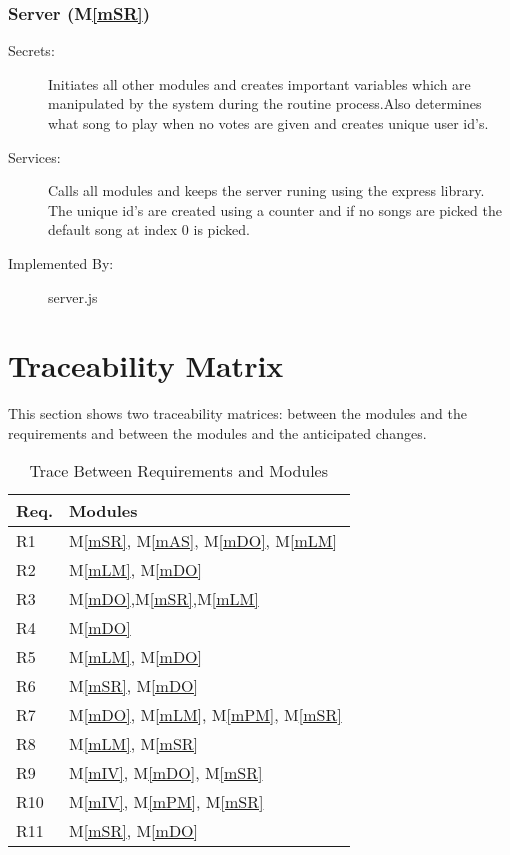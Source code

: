 \documentclass[12pt, titlepage]{article}
\newcommand{\mref}[1]{M\ref{#1}}
\begin{document}
\subsubsection{Server (\mref{mSR})}


\begin{description}
\item[Secrets:] Initiates all other modules and creates important variables which are manipulated by the system during the routine process.Also determines what song to play when no votes are given and creates unique user id's. 
\item[Services:]Calls all modules and keeps the server runing using the express library. The unique id's are created using a counter and if no songs are picked the default song at index 0 is picked.
\item[Implemented By:] server.js
\end{description}





\section{Traceability Matrix} \label{SecTM}


This section shows two traceability matrices: between the modules and the
requirements and between the modules and the anticipated changes.


\begin{table}[H]
\centering
\begin{tabular}{p{} p{}}
\toprule
\textbf{Req.} & \textbf{Modules}\\
\midrule
R1 & \mref{mSR}, \mref{mAS}, \mref{mDO}, \mref{mLM}\\
R2 & \mref{mLM}, \mref{mDO}\\
R3 & \mref{mDO},\mref{mSR},\mref{mLM}\\
R4 & \mref{mDO}\\
R5 & \mref{mLM}, \mref{mDO}\\
R6 & \mref{mSR}, \mref{mDO}\\
R7 & \mref{mDO}, \mref{mLM}, \mref{mPM}, \mref{mSR}\\
R8 & \mref{mLM}, \mref{mSR}\\
R9 & \mref{mIV}, \mref{mDO}, \mref{mSR}\\
R10 & \mref{mIV}, \mref{mPM}, \mref{mSR}\\
R11 & \mref{mSR}, \mref{mDO}\\
\bottomrule
\end{tabular}
\caption{Trace Between Requirements and Modules}
\label{TblRT}
\end{table}
\end{document}
